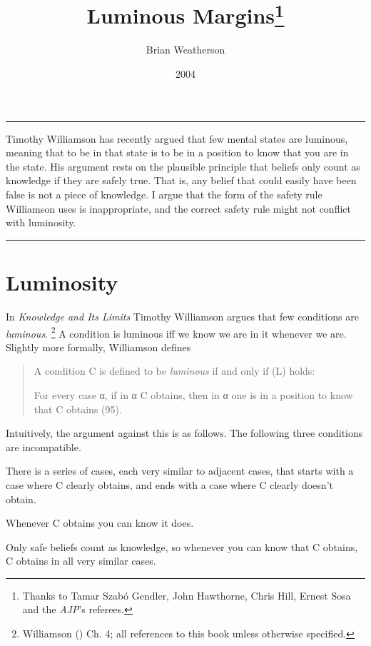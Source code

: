 \documentclass[
  10pt,
  letterpaper,
  DIV=11,
  numbers=noendperiod,
  twoside]{scrartcl}
\title{Luminous Margins\thanks{Thanks to Tamar Szabó Gendler, John
Hawthorne, Chris Hill, Ernest Sosa and the \emph{AJP}'s referees.}}
\author{Brian Weatherson}
\date{2004}
\providecommand{\tightlist}{%
  \setlength{\itemsep}{0pt}\setlength{\parskip}{0pt}}\usepackage{longtable,booktabs,array}
\renewenvironment{abstract}
 {\vspace{-1.25cm}
 \quotation\small\noindent\rule{\linewidth}{.5pt}\par\smallskip
 \noindent }
 {\par\noindent\rule{\linewidth}{.5pt}\endquotation}
\begin{document}
\maketitle
\begin{abstract}
Timothy Williamson has recently argued that few mental states are
luminous, meaning that to be in that state is to be in a position to
know that you are in the state. His argument rests on the plausible
principle that beliefs only count as knowledge if they are safely true.
That is, any belief that could easily have been false is not a piece of
knowledge. I argue that the form of the safety rule Williamson uses is
inappropriate, and the correct safety rule might not conflict with
luminosity.
\end{abstract}


\section{Luminosity}\label{luminosity}

In \emph{Knowledge and Its Limits} Timothy Williamson argues that few
conditions are \emph{luminous}. \footnote{Williamson
  () Ch. 4; all references to
  this book unless otherwise specified.} A condition is luminous iff we
know we are in it whenever we are. Slightly more formally, Williamson
defines

\begin{quote}
A condition C is defined to be \emph{luminous} if and only if (L) holds:

\begin{description}
\tightlist
\item[(L)]
For every case α, if in α C obtains, then in α one is in a position to
know that C obtains (95).
\end{description}
\end{quote}

Intuitively, the argument against this is as follows. The following
three conditions are incompatible.

\begin{description}
\tightlist
\item[Gradual Change]
There is a series of cases, each very similar to adjacent cases, that
starts with a case where C clearly obtains, and ends with a case where C
clearly doesn't obtain.
\item[Luminosity]
Whenever C obtains you can know it does.
\item[Safety]
Only safe beliefs count as knowledge, so whenever you can know that C
obtains, C obtains in all very similar cases.
\end{description}
\end{document}
